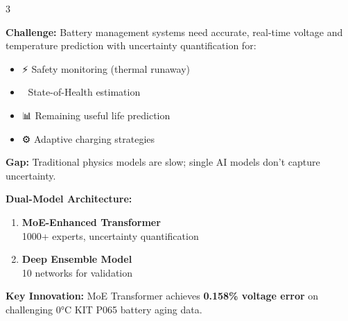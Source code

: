 \documentclass[final,a0paper,portrait]{a0poster}
\begin{document}
\begin{multicols}{3}


\begin{bluebox}[title=🎯 Problem Statement]
\large
\textbf{Challenge:} Battery management systems need accurate, real-time voltage and temperature prediction with uncertainty quantification for:

\begin{itemize}
    \item ⚡ Safety monitoring (thermal runaway)
    \item 🔋 State-of-Health estimation
    \item 📊 Remaining useful life prediction
    \item ⚙️ Adaptive charging strategies
\end{itemize}

\vspace{0.5cm}
\textbf{Gap:} Traditional physics models are slow; single AI models don't capture uncertainty.
\end{bluebox}

\vspace{1cm}

\begin{orangebox}[title=💡 Our Solution]
\large
\textbf{Dual-Model Architecture:}

\begin{enumerate}
    \item \textbf{MoE-Enhanced Transformer}\\
    1000+ experts, uncertainty quantification
    
    \item \textbf{Deep Ensemble Model}\\
    10 networks for validation
\end{enumerate}

\vspace{0.5cm}
\textbf{Key Innovation:} MoE Transformer achieves \textbf{0.158\% voltage error} on challenging 0°C KIT P065 battery aging data.
\end{orangebox}

\vspace{1cm}

\begin{bluebox}[title=🏗️ System Architecture]
\large


\end{bluebox}
\end{multicols}
\end{document}

